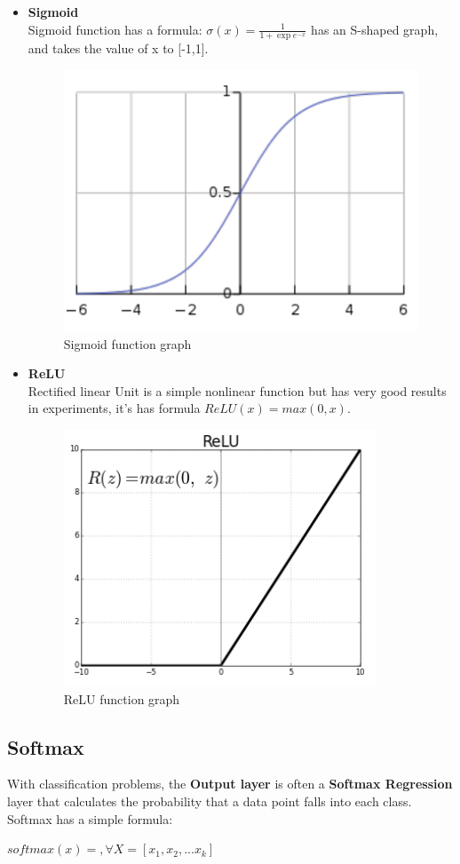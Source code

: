 \begin{itemize}
	\item \textbf{Sigmoid}\\
	Sigmoid function has a formula: $ \sigma(x) = \frac{1}{1+\exp e^{-x}}$ has an S-shaped graph, and takes the value of x to [-1,1].
	\begin{center}
		\begin{figure}[H]
			\centering
			\includegraphics[width=0.5\columnwidth]{images/chap2/sigmoid.png}
			\caption{Sigmoid function graph}
			\label{chap2:sigmoid}
		\end{figure}
	\end{center}
	\item \textbf{ReLU}\\
	Rectified linear Unit is a simple nonlinear function but has very good results in experiments, it's has formula $ReLU(x) = max (0,x)$.
		\begin{center}
		\begin{figure}[H]
			\centering
			\includegraphics[width=0.5\columnwidth]{images/chap2/ReLU.png}
			\caption{ReLU function graph}
			\label{chap2:relu}
		\end{figure}
	\end{center}
\end{itemize}
\vspace{-1cm}
\subsection{Softmax}

With classification problems, the \textbf{Output layer} is often a \textbf{Softmax Regression} layer that calculates the probability that a data point falls into each class. Softmax has a simple formula:\\
\begin{center}
	$ softmax(x) = $$, \forall X = [x_{1},x_{2},...x_{k}]$
\end{center}


